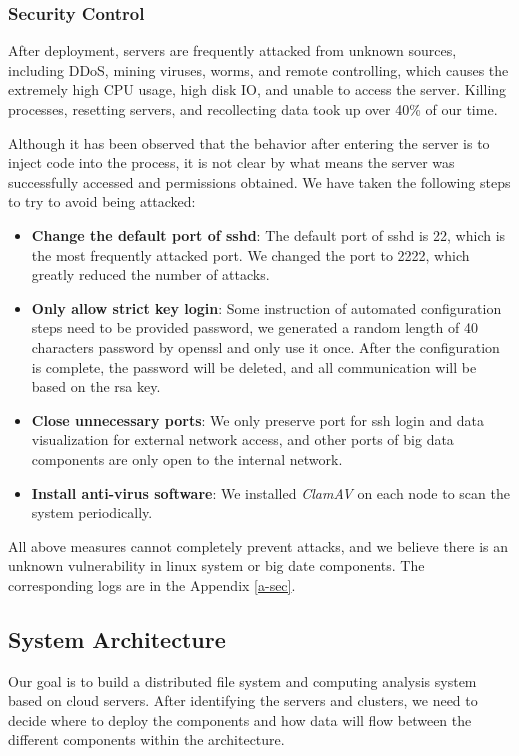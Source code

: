 \subsubsection{Security Control}    
After deployment, servers are frequently attacked from unknown sources, including DDoS, mining viruses, worms, and remote controlling, which causes the extremely high CPU usage, high disk IO, and unable to access the server. Killing processes, resetting servers, and recollecting data took up over 40\% of our time.


Although it has been observed that the behavior after entering the server is to inject code into the process, it is not clear by what means the server was successfully accessed and permissions obtained. We have taken the following steps to try to avoid being attacked:

\begin{itemize}
    \item \textbf{Change the default port of sshd}: The default port of sshd is 22, which is the most frequently attacked port. We changed the port to 2222, which greatly reduced the number of attacks.
    \item \textbf{Only allow strict key login}: Some instruction of automated configuration steps need to be provided password, we generated a random length of 40 characters password by openssl and only use it once. After the configuration is complete, the password will be deleted, and all communication will be based on the rsa key.
    \item \textbf{Close unnecessary ports}: We only preserve port for ssh login and data visualization for external network access, and other ports of big data components are only open to the internal network.
    \item \textbf{Install anti-virus software}: We installed \textit{ClamAV} on each node to scan the system periodically.
\end{itemize}

All above measures cannot completely prevent attacks, and we believe there is an unknown vulnerability in linux system or big date components. The corresponding logs are in the Appendix \ref{a-sec}.




\subsection{System Architecture}
Our goal is to build a distributed file system and computing analysis system based on cloud servers. After identifying the servers and clusters, we need to decide where to deploy the components and how data will flow between the different components within the architecture.



